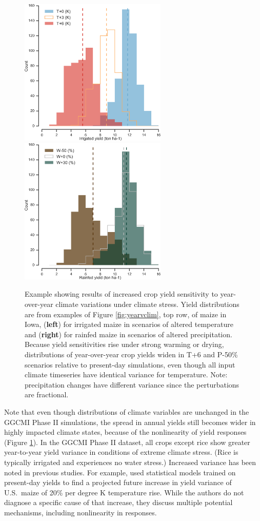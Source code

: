 \documentclass[gmd, manuscript]{copernicus} %
\begin{document}
\begin{figure}[ht]
\centering
   \includegraphics[width=7cm]{figures/hist_year_t.png} \hspace{10mm} \includegraphics[width=7cm]{figures/hist_year_pr.png}
   \caption{
   Example showing results of increased crop yield sensitivity to year-over-year climate variations under climate stress. 
   Yield distributions are from examples of Figure \ref{fig:yearvclim}, top row, of maize in Iowa, (\textbf{left}) for irrigated maize in scenarios of altered temperature and (\textbf{right}) for rainfed maize in scenarios of altered precipitation.
   Because yield sensitivities rise under strong warming or drying, distributions of year-over-year crop yields widen in T+6  and P-50\% scenarios relative to present-day simulations, even though all input climate timeseries have identical variance for temperature. Note: precipitation changes have different variance since the perturbations are fractional.  
    }
   \label{fig:yearly}
\end{figure}

Note that even though distributions of climate variables are unchanged in the GGCMI Phase II simulations, the spread in annual yields still becomes wider in highly impacted climate states, because of the nonlinearity of yield responses (Figure \ref{fig:yearly}). 
In the GGCMI Phase II dataset, all crops except rice show  greater year-to-year yield variance  in conditions of extreme climate stress.
(Rice is typically irrigated and experiences no water stress.) 
Increased variance has been noted in previous studies. For example, \cite{Urban2012} used statistical models trained on present-day yields to find a projected future increase in yield variance of U.S.\ maize of 20\% per degree K temperature rise. While the authors do not diagnose a specific cause of that increase, they discuss multiple potential mechanisms, including nonlinearity in responses. 
\end{document}

